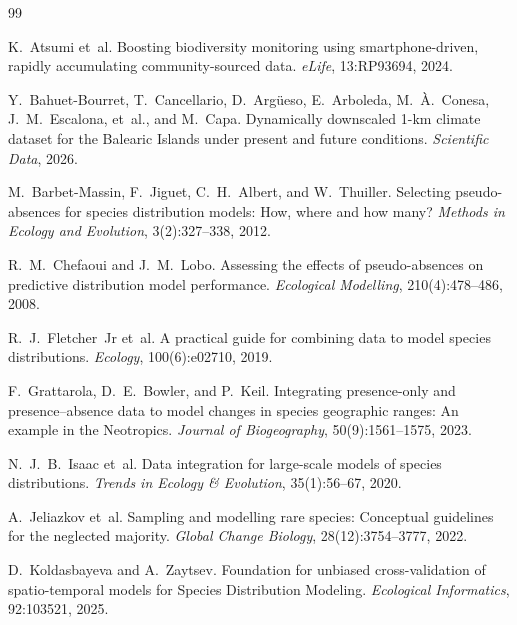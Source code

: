 \documentclass[11pt,letterpaper]{article}
\begin{document}
\begin{thebibliography}{99}

K.~Atsumi et~al.
\newblock Boosting biodiversity monitoring using smartphone-driven, rapidly accumulating community-sourced data.
\newblock \emph{eLife}, 13:RP93694, 2024.

Y.~Bahuet-Bourret, T.~Cancellario, D.~Arg\"ueso, E.~Arboleda, M.~\`A.~Conesa, J.~M.~Escalona, et~al., and M.~Capa.
\newblock Dynamically downscaled 1-km climate dataset for the Balearic Islands under present and future conditions.
\newblock \emph{Scientific Data}, 2026.

M.~Barbet-Massin, F.~Jiguet, C.~H.~Albert, and W.~Thuiller.
\newblock Selecting pseudo-absences for species distribution models: How, where and how many?
\newblock \emph{Methods in Ecology and Evolution}, 3(2):327--338, 2012.

R.~M.~Chefaoui and J.~M.~Lobo.
\newblock Assessing the effects of pseudo-absences on predictive distribution model performance.
\newblock \emph{Ecological Modelling}, 210(4):478--486, 2008.

R.~J.~Fletcher~Jr et~al.
\newblock A practical guide for combining data to model species distributions.
\newblock \emph{Ecology}, 100(6):e02710, 2019.

F.~Grattarola, D.~E.~Bowler, and P.~Keil.
\newblock Integrating presence-only and presence--absence data to model changes in species geographic ranges: An example in the Neotropics.
\newblock \emph{Journal of Biogeography}, 50(9):1561--1575, 2023.

N.~J.~B.~Isaac et~al.
\newblock Data integration for large-scale models of species distributions.
\newblock \emph{Trends in Ecology \& Evolution}, 35(1):56--67, 2020.

A.~Jeliazkov et~al.
\newblock Sampling and modelling rare species: Conceptual guidelines for the neglected majority.
\newblock \emph{Global Change Biology}, 28(12):3754--3777, 2022.

D.~Koldasbayeva and A.~Zaytsev.
\newblock Foundation for unbiased cross-validation of spatio-temporal models for Species Distribution Modeling.
\newblock \emph{Ecological Informatics}, 92:103521, 2025.


\end{thebibliography}
\end{document}
